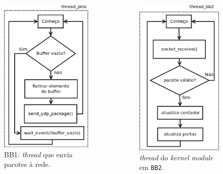 \begin{frame}
\begin{columns}
\begin{column}{.33\textwidth}
\begin{figure}[h!]
		  \centering
		  \includegraphics[scale=0.260]{image/thread_proc}
		  \caption{\centering BB1: \textit{thread} que envia pacotes à
		  rede.}
		  \label{fig:thread_proc} 
\end{figure}
\end{column}

\begin{column}{.33\textwidth}

\begin{figure}[h!]
			\centering
			\includegraphics[scale=0.260]{image/thread_bb2}
			\caption {\centering \textit{thread} do \textit{kernel module}
			em
			\texttt{BB2}.}
			\label{fig:thread_bb2}
\end{figure}
\end{column}

\end{columns}
\end{frame}

